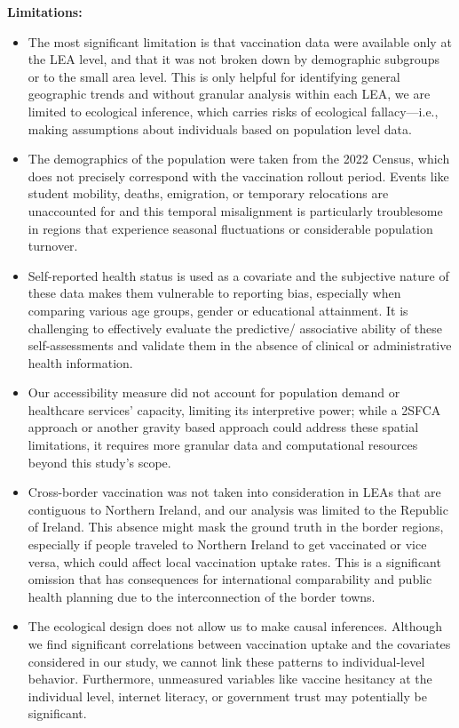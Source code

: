\documentclass{article}
\begin{document}
\textbf{Limitations:}

\begin{itemize}
\item
  The most significant limitation is that vaccination data were
  available only at the LEA level, and that it was not broken down by
  demographic subgroups or to the small area level. This is only helpful
  for identifying general geographic trends and without granular
  analysis within each LEA, we are limited to ecological inference,
  which carries risks of ecological fallacy---i.e., making assumptions
  about individuals based on population level data.
\item
  The demographics of the population were taken from the 2022 Census,
  which does not precisely correspond with the vaccination rollout
  period. Events like student mobility, deaths, emigration, or temporary
  relocations are unaccounted for and this temporal misalignment is
  particularly troublesome in regions that experience seasonal
  fluctuations or considerable population turnover.
\item
  Self-reported health status is used as a covariate and the subjective
  nature of these data makes them vulnerable to reporting bias,
  especially when comparing various age groups, gender or educational
  attainment. It is challenging to effectively evaluate the predictive/
  associative ability of these self-assessments and validate them in the
  absence of clinical or administrative health information.
\item
  Our accessibility measure did not account for population demand or
  healthcare services' capacity, limiting its interpretive power; while
  a 2SFCA approach or another gravity based approach could address these
  spatial limitations, it requires more granular data and computational
  resources beyond this study's scope.
\item
  Cross-border vaccination was not taken into consideration in LEAs that
  are contiguous to Northern Ireland, and our analysis was limited to
  the Republic of Ireland. This absence might mask the ground truth in
  the border regions, especially if people traveled to Northern Ireland
  to get vaccinated or vice versa, which could affect local vaccination
  uptake rates. This is a significant omission that has consequences for
  international comparability and public health planning due to the
  interconnection of the border towns.
\item
  The ecological design does not allow us to make causal inferences.
  Although we find significant correlations between vaccination uptake
  and the covariates considered in our study, we cannot link these
  patterns to individual-level behavior. Furthermore, unmeasured
  variables like vaccine hesitancy at the individual level, internet
  literacy, or government trust may potentially be significant.
\end{itemize}
\end{document}
